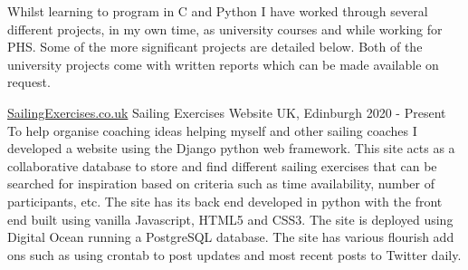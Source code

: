 
\begin{cvparagraph}
Whilst learning to program in C and Python I have worked through several different projects, in my own time, as university courses and while working for PHS. Some of the more significant projects are detailed below. Both of the university projects come with written reports which can be made available on request.
\end{cvparagraph}

\begin{cventries}
    \cventry
        {\href{www.sailingexercises.co.uk}{SailingExercises.co.uk}}
        {Sailing Exercises Website}
        {UK, Edinburgh}
        {2020 - Present}
        {
        To help organise coaching ideas helping myself and other sailing coaches I developed a website using the Django python web framework. This site acts as a collaborative database to store and find different sailing exercises that can be searched for inspiration based on criteria such as time availability, number of participants, etc. The site has its back end developed in python with the front end built using vanilla Javascript, HTML5 and CSS3. The site is deployed using Digital Ocean running a PostgreSQL database. The site has various flourish add ons such as using crontab to post updates and most recent posts to Twitter daily.
        }
\end{cventries}

